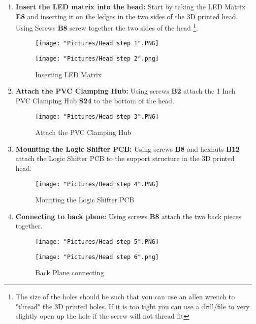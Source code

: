 \documentclass[12pt]{article}
\begin{document}
\begin{enumerate}

	\item \textbf{Insert the LED matrix into the head:} Start by taking the LED Matrix \textbf{E8} and inserting it on the ledges in the two sides of the 3D printed head. Using Screws \textbf{B8} screw together the two sides of the head \footnote{The size of the holes should be such that you can use an allen wrench to "thread" the 3D printed holes. If it is too tight you can use a drill/file to very slightly open up the hole if the screw will not thread fit}.


\begin{figure}[H]
	\centering
  	\begin{minipage}[b]{0.45\textwidth}
		\texttt{[image: "Pictures/Head step 1".PNG]}
  	\end{minipage}
  	\hfill
  	\begin{minipage}[b]{0.45\textwidth}
    		\texttt{[image: "Pictures/Head step 2".png]}
  	\end{minipage}
  	\caption{Inserting LED Matrix}
  	\label{LED}
\end{figure}

	\item \textbf{Attach the PVC  Clamping Hub:} Using screws \textbf{B2} attach the 1 Inch PVC Clamping Hub \textbf{S24} to the bottom of the head. 

\begin{figure}[H]
	\centering
	\texttt{[image: "Pictures/Head step 3".PNG]}
	\caption{Attach the PVC Clamping Hub}
\end{figure}

	\item \textbf{Mounting the Logic Shifter PCB:} Using screws \textbf{B8} and hexnuts \textbf{B12} attach the Logic Shifter PCB to the support structure in the 3D printed head. 

\begin{figure}[H]
	\centering
	\texttt{[image: "Pictures/Head step 4".PNG]}
	\caption{Mounting the Logic Shifter PCB}
\end{figure}

	\item \textbf{Connecting to back plane:} Using screws \textbf{B8} attach the two back pieces together. 

\begin{figure}[H]
	\centering
  	\begin{minipage}[b]{0.45\textwidth}
		\texttt{[image: "Pictures/Head step 5".PNG]}
  	\end{minipage}
  	\hfill
  	\begin{minipage}[b]{0.45\textwidth}
    		\texttt{[image: "Pictures/Head step 6".png]}
  	\end{minipage}
  	\caption{Back Plane connecting}
  	\label{back}
\end{figure}


\end{enumerate}
\end{document}
